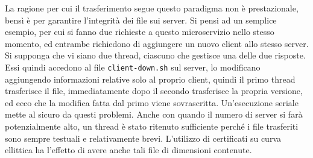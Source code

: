 La ragione per cui il trasferimento segue questo paradigma non è prestazionale, bensì è per
garantire l'integrità dei file sui server.
Si pensi ad un semplice esempio, per cui si fanno due richieste a questo microservizio nello stesso
momento, ed entrambe richiedono di aggiungere un nuovo client allo stesso server.
Si supponga che vi siano due thread, ciascuno che gestisce una delle due risposte. Essi quindi
accedono al file \texttt{client-down.sh} sul server, lo modificano aggiungendo informazioni
relative solo al proprio client, quindi il primo thread trasferisce il file, immediatamente dopo
il secondo trasferisce la propria versione, ed ecco che la modifica fatta dal primo viene
sovrascritta.
Un'esecuzione seriale mette al sicuro da questi problemi. Anche con quando il numero di server
si farà potenzialmente alto, un thread è stato ritenuto sufficiente perché i file trasferiti
sono sempre testuali e relativamente brevi. L'utilizzo di certificati su curva ellittica
ha l'effetto di avere anche tali file di dimensioni contenute.